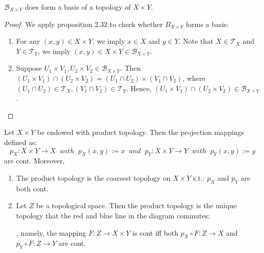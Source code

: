 \begin{proposition}
    $\mathcal{B}_{X\times Y}$ does form a basis of a topology of $X\times Y$.
\end{proposition}

\begin{proof}
    We apply proposition 2.32 to check whether $B_{X\times Y}$ forms a basis:
    \begin{enumerate}
        \item For any $(x,y) \in X\times Y$, we imply $x \in X$ and $y \in Y$. Note that $X \in \mathcal{T}_X$ and $Y\in \mathcal{T}_Y$, we imply $(x,y) \in X\times Y \in \mathcal{B}_{X\times Y}$.
        \item Suppose $U_1\times V_1, U_2\times V_2 \in \mathcal{B}_{X\times Y}$. Then $(U_1\times V_1) \cap (U_2 \times V_2) = (U_1\cap U_2) \times (V_1\cap V_2)$, where $(U_1\cap U_2) \in \mathcal{T}_X, (V_1\cap V_2) \in \mathcal{T}_Y$. Hence, $(U_1\times V_1) \cap (U_2 \times V_2) \in \mathcal{B}_{X\times Y}$.
    \end{enumerate}
\end{proof}

\begin{proposition}
    Let $X\times Y$ be endowed with product topology. Then the projection mappings defined as:
    $$p_X: X\times Y \rightarrow X \; \; with \;\; p_X(x,y) :=x \;\; and\;\; p_Y :X\times Y \rightarrow Y \;\; with\;\; p_Y(x,y):= y$$ 
    are cont. Moreover,
    \begin{enumerate}
        \item The product topology is the coarsest topology on $X\times Y$ s.t.: $p_X$ and $p_Y$ are both cont.
        \item Let $Z $ be a topological space. Then the product topology is the unique topology that the red and blue line in the diagram commutes:
        , namely, the mapping $F: Z \rightarrow X\times Y$ is cont iff both $p_X \circ F: Z\rightarrow X$ and $p_Y \circ F: Z \rightarrow Y$ are cont.
    \end{enumerate}
\end{proposition}

